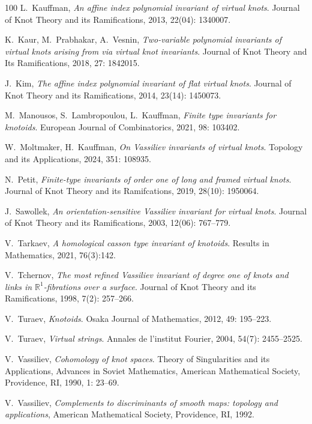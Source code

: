 \documentclass[11pt]{amsart}
\theoremstyle{noparens}
\numberwithin{equation}{section}
\numberwithin{equation}{section}
\begin{document}
\begin{thebibliography}{100}
L.~Kauffman, \textit{An affine index polynomial invariant of virtual knots}. Journal of Knot Theory and its Ramifications, 2013, 22(04): 1340007.

K.~Kaur, M.~Prabhakar, A.~Vesnin, \textit{Two-variable polynomial invariants of virtual knots arising from via virtual knot invariants}. Journal of Knot Theory and Its Ramifications, 2018, 27: 1842015.

J.~Kim, \textit{The affine index polynomial invariant of flat virtual knots}. Journal of Knot Theory and its Ramifications, 2014, 23(14): 1450073.

M.~Manousos, S.~Lambropoulou, L.~Kauffman, \textit{Finite type invariants for knotoids}. European Journal of Combinatorics, 2021, 98: 103402.

W.~Moltmaker, H.~Kauffman, \textit{On Vassiliev invariants of virtual knots}. Topology and its Applications, 2024, 351: 108935.


N.~Petit, \textit{Finite-type invariants of order one of long and framed virtual knots}. Journal of Knot Theory and its Ramifcations, 2019, 28(10): 1950064.

J.~Sawollek, \textit{An orientation-sensitive Vassiliev invariant for virtual knots}. Journal of Knot Theory and its Ramifications, 2003, 12(06): 767--779.

V.~Tarkaev, \textit{A homological casson type invariant of knotoids}. Results in Mathematics, 2021, 76(3):142.

V.~Tchernov, \textit{The most refined Vassiliev invariant of degree one of knots and links in $\mathbb{R}^1$-fibrations over a surface}. Journal of Knot Theory and its Ramifications, 1998, 7(2): 257--266.

V.~Turaev, \textit{Knotoids}. Osaka Journal of Mathematics, 2012, 49: 195--223.

V.~Turaev, \textit{Virtual strings}. Annales de l'institut Fourier, 2004, 54(7): 2455--2525.

V.~Vassiliev, \textit{Cohomology of knot spaces}. Theory of Singularities and its Applications, Advances in Soviet Mathematics, American Mathematical Society, Providence, RI, 1990, 1: 23--69.

V.~Vassiliev, \textit{Complements to discriminants of smooth maps: topology and applications}, American Mathematical Society, Providence, RI, 1992.

\end{thebibliography}
\end{document}
